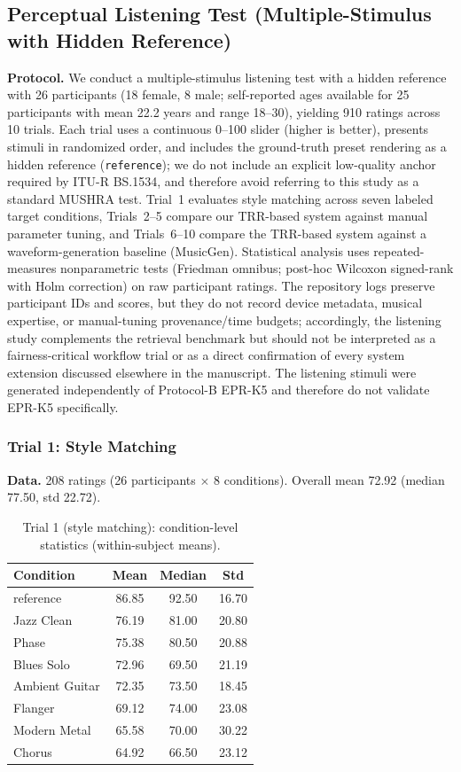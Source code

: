 \subsection{Perceptual Listening Test (Multiple-Stimulus with Hidden Reference)}
\label{ssec:mushra}

\textbf{Protocol.} We conduct a multiple-stimulus listening test with a hidden reference with 26 participants (18 female, 8 male; self-reported ages available for 25 participants with mean 22.2 years and range 18--30), yielding 910 ratings across 10 trials. Each trial uses a continuous 0--100 slider (higher is better), presents stimuli in randomized order, and includes the ground-truth preset rendering as a hidden reference (\texttt{reference}); we do not include an explicit low-quality anchor required by ITU-R BS.1534, and therefore avoid referring to this study as a standard MUSHRA test. Trial~1 evaluates style matching across seven labeled target conditions, Trials~2--5 compare our TRR-based system against manual parameter tuning, and Trials~6--10 compare the TRR-based system against a waveform-generation baseline (MusicGen). Statistical analysis uses repeated-measures nonparametric tests (Friedman omnibus; post-hoc Wilcoxon signed-rank with Holm correction) on raw participant ratings. The repository logs preserve participant IDs and scores, but they do not record device metadata, musical expertise, or manual-tuning provenance/time budgets; accordingly, the listening study complements the retrieval benchmark but should not be interpreted as a fairness-critical workflow trial or as a direct confirmation of every system extension discussed elsewhere in the manuscript. The listening stimuli were generated independently of Protocol-B EPR-K5 and therefore do not validate EPR-K5 specifically.

\subsubsection{Trial 1: Style Matching}
\textbf{Data.} 208 ratings (26 participants $\times$ 8 conditions). Overall mean 72.92 (median 77.50, std 22.72).

\begin{table}[t]
	\centering
	\caption{Trial 1 (style matching): condition-level statistics (within-subject means).}
	\label{tab:mushra_trial1_stats}
	\begin{tabular}{lccc}
		\toprule
		\textbf{Condition} & \textbf{Mean} & \textbf{Median} & \textbf{Std} \\
		\midrule
		reference & 86.85 & 92.50 & 16.70 \\
		Jazz Clean & 76.19 & 81.00 & 20.80 \\
		Phase & 75.38 & 80.50 & 20.88 \\
		Blues Solo & 72.96 & 69.50 & 21.19 \\
		Ambient Guitar & 72.35 & 73.50 & 18.45 \\
		Flanger & 69.12 & 74.00 & 23.08 \\
		Modern Metal & 65.58 & 70.00 & 30.22 \\
		Chorus & 64.92 & 66.50 & 23.12 \\
		\bottomrule
	\end{tabular}
\end{table}

